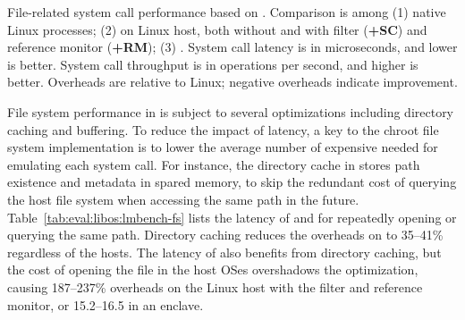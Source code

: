 \label{sec:eval:libos:fs}


\begin{table}[t!b!]

\caption{File-related system call performance based on \lmbench{}. 
Comparison is among (1) native Linux processes; (2) \graphene{} on Linux host, both without and with \seccomp{} filter ({\bf +SC}) and reference monitor ({\bf +RM}); (3) \graphenesgx{}.
System call latency is in microseconds, and lower is better.
System call throughput is in operations per second, and higher is better. 
Overheads are relative to Linux; negative overheads indicate improvement.} 
\label{tab:eval:libos:lmbench-fs}
\end{table}

File system performance in \thelibos{}
is subject to several optimizations including directory caching and buffering.
To reduce the impact of \hostapi{} latency,
a key to the chroot file system implementation
is to lower the average number of expensive \hostapis{}
needed for emulating each system call.
For instance, the directory cache
in \thelibos{} stores path existence and metadata
in spared \picoproc{} memory,
to skip the redundant cost
of querying the host file system
when accessing the same path in the future.
Table~\ref{tab:eval:libos:lmbench-fs} lists the latency of  and 
for repeatedly opening or querying the same path.
Directory caching
reduces the overheads on  to 35--41\%
regardless of the hosts.
The latency of 
also benefits from directory caching, but the cost of opening the file in the host OSes
overshadows the optimization,
causing 187--237\% overheads on the Linux host with the \seccomp{} filter and reference monitor,
or 15.2--16.5\x{} in an enclave.






